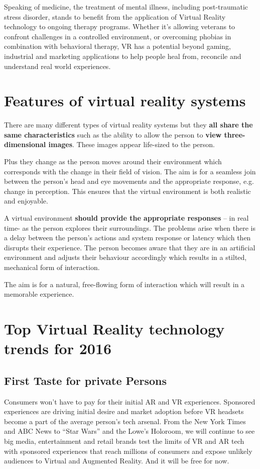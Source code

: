 	Speaking of medicine, the treatment of mental illness, including post-traumatic stress disorder, stands to benefit from the application of Virtual Reality technology to ongoing therapy programs. Whether it’s allowing veterans to confront challenges in a controlled environment, or overcoming phobias in combination with behavioral therapy, VR has a potential beyond gaming, industrial and marketing applications to help people heal from, reconcile and understand real world experiences.

\section{Features of virtual reality systems}

There are many different types of virtual reality systems but they \textbf{all share the same characteristics} such as the ability to allow the person to \textbf{view three-dimensional images}. These images appear life-sized to the person.

Plus they change as the person moves around their environment which corresponds with the change in their field of vision. The aim is for a seamless join between the person’s head and eye movements and the appropriate response, e.g. change in perception. This ensures that the virtual environment is both realistic and enjoyable.

A virtual environment \textbf{should provide the appropriate responses} – in real time- as the person explores their surroundings. The problems arise when there is a delay between the person’s actions and system response or latency which then disrupts their experience. The person becomes aware that they are in an artificial environment and adjusts their behaviour accordingly which results in a stilted, mechanical form of interaction.

The aim is for a natural, free-flowing form of interaction which will result in a memorable experience.

\newpage
\section{Top Virtual Reality technology trends for 2016}

	\subsection{First Taste for private Persons}
	
	Consumers won’t have to pay for their initial AR and VR experiences. Sponsored experiences are driving initial desire and market adoption before VR headsets become a part of the average person’s tech arsenal. From the New York Times and ABC News to “Star Wars” and the Lowe’s Holoroom, we will continue to see big media, entertainment and retail brands test the limits of VR and AR tech with sponsored experiences that reach millions of consumers and expose unlikely audiences to Virtual and Augmented Reality. And it will be free for now.
	
